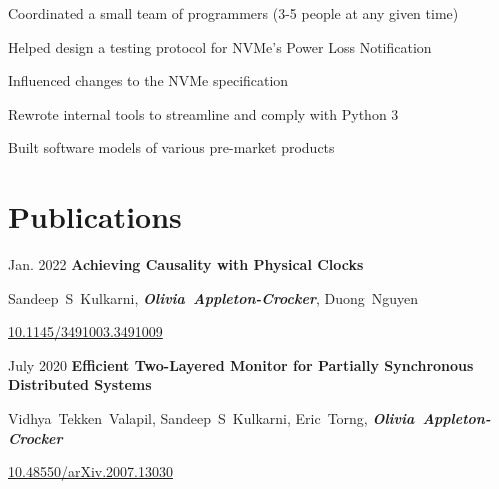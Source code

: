 	\vspace{-0.35 cm}
	\begin{onecolentry}
		\begin{highlights}
			\item Coordinated a small team of programmers (3-5 people at any given
			time) \item Helped design a testing protocol for NVMe's Power Loss Notification
			\item Influenced changes to the NVMe specification \item Rewrote internal tools
			to streamline and comply with Python 3 \item Built software models of various
			pre-market products
		\end{highlights}
	\end{onecolentry}

	\vspace{-0.1 cm}

	\section{Publications}

	\begin{samepage}
		\begin{twocolentry}
			{ Jan. 2022 } \textbf{Achieving Causality with Physical Clocks}
		\end{twocolentry}

		\vspace{0.10 cm}

		\begin{onecolentry}
			\mbox{Sandeep S Kulkarni},
			\mbox{\textbf{\textit{Olivia Appleton-Crocker}}}, \mbox{Duong Nguyen}

			\vspace{0.10 cm}

			\href{https://doi.org/10.1145/3491003.3491009}{10.1145/3491003.3491009}
		\end{onecolentry}
	\end{samepage}

	\vspace{0.2 cm}

	\begin{samepage}
		\begin{twocolentry}
			{ July 2020 } \textbf{Efficient Two-Layered Monitor for Partially
			Synchronous Distributed Systems}
		\end{twocolentry}

		\vspace{0.10 cm}

		\begin{onecolentry}
			\mbox{Vidhya Tekken Valapil}, \mbox{Sandeep S Kulkarni}, \mbox{Eric Torng},
			\mbox{\textbf{\textit{Olivia Appleton-Crocker}}}

			\vspace{0.10 cm}

			\href{https://doi.org/10.48550/arXiv.2007.13030}{10.48550/arXiv.2007.13030}
		\end{onecolentry}
	\end{samepage}

